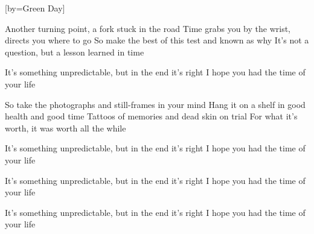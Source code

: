 

[by=Green Day]

\begin{LARGE}


\beginverse
Another turning point, a fork stuck in the road
Time grabs you by the wrist, directs you where to go
So make the best of this test and known as why
It's not a question, but a lesson learned in time
\endverse

\beginchorus
It's something unpredictable, but in the end it's right
I hope you had the time of your life
\endchorus

\beginverse
So take the photographs and still-frames in your mind
Hang it on a shelf in good health and good time
Tattoos of memories and dead skin on trial
For what it's worth, it was worth all the while
\endverse

\beginchorus
It's something unpredictable, but in the end it's right
I hope you had the time of your life
\endchorus

\beginchorus
It's something unpredictable, but in the end it's right
I hope you had the time of your life
\endchorus

\beginchorus
It's something unpredictable, but in the end it's right
I hope you had the time of your life
\endchorus


\end{LARGE}


\chordson
\endsong

